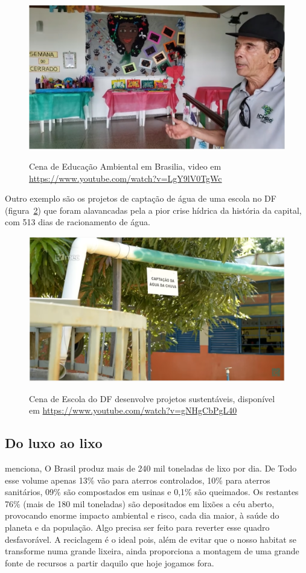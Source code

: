 \begin{figure}[h!]
    \centering
    \href{https://www.youtube.com/watch?v=LgY9lV0TgWc}{
        \includegraphics[width=0.7\linewidth]{"fig/Educação Ambiental em Brasília"}
    }
    \caption[Educação Ambiental em Brasilia]{Cena de Educação Ambiental em Brasilia, video em \url{https://www.youtube.com/watch?v=LgY9lV0TgWc}}
    \label{fig:educacao-ambiental-em-brasilia}
\end{figure}

Outro exemplo são os projetos de captação de água de uma escola no DF (figura~\ref{fig:captacao-agua-brasilia}) que foram alavancadas pela a pior crise hídrica da história da capital, com 513 dias de racionamento de água.

\begin{figure}
    \centering
    \href{https://www.youtube.com/watch?v=gNHgCbPgL40}{
        \includegraphics[width=0.7\linewidth]{fig/Captacao-Agua-Brasilia}
    }
    \caption[Escola do DF desenvolve projetos sustentáveis]{Cena de Escola do DF desenvolve projetos sustentáveis, disponível em \url{https://www.youtube.com/watch?v=gNHgCbPgL40}}
    \label{fig:captacao-agua-brasilia}
\end{figure}

\subsection{Do luxo ao lixo}


 menciona, O Brasil produz mais de 240 mil toneladas de lixo por dia. De Todo esse volume apenas 13\% vão para aterros controlados, 10\% para aterros sanitários, 09\% são compostados em usinas e 0,1\% são queimados. Os restantes 76\% (mais de 180 mil toneladas) são depositados em lixões a céu aberto, provocando enorme impacto ambiental e risco, cada dia maior, à saúde do planeta e da população. Algo precisa ser feito para reverter esse quadro desfavorável. A reciclagem é o ideal pois, além de evitar que o nosso habitat se transforme numa grande lixeira, ainda proporciona a montagem de uma grande fonte de recursos a partir daquilo que hoje jogamos fora.

